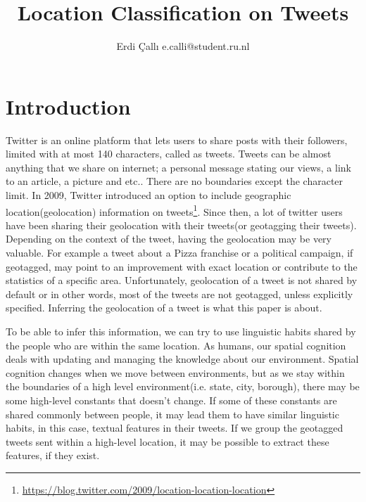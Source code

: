 \documentclass[twoside,11pt]{article}
\begin{document}
\title{Location Classification on Tweets}
\author{\name Erdi \c{C}all{\i}  \email e.calli@student.ru.nl}
\maketitle
\begin{abstract}

\end{abstract}


\section{Introduction}

Twitter is an online platform that lets users to share posts with their followers, limited with at most 140 characters, called as tweets. Tweets can be almost anything that we share on internet; a personal message stating our views, a link to an article, a picture and etc.. There are no boundaries except the character limit. In 2009, Twitter introduced an option to include geographic location(geolocation) information on tweets\footnote{\url{https://blog.twitter.com/2009/location-location-location}}. Since then, a lot of twitter users have been sharing their geolocation with their tweets(or geotagging their tweets). Depending on the context of the tweet, having the geolocation may be very valuable. For example a tweet about a Pizza franchise or a political campaign, if geotagged, may point to an improvement with exact location or contribute to the statistics of a specific area. Unfortunately, geolocation of a tweet is not shared by default or in other words, most of the tweets are not geotagged, unless explicitly specified. Inferring the geolocation of a tweet is what this paper is about.

To be able to infer this information, we can try to use linguistic habits shared by the people who are within the same location. As humans, our spatial cognition deals with updating and managing the knowledge about our environment. Spatial cognition changes when we move between environments, but as we stay within the boundaries of a high level environment(i.e. state, city, borough), there may be some high-level constants that doesn't change. If some of these constants are shared commonly between people, it may lead them to have similar linguistic habits, in this case, textual features in their tweets. If we group the geotagged tweets sent within a high-level location, it may be possible to extract these features, if they exist.
\end{document}
